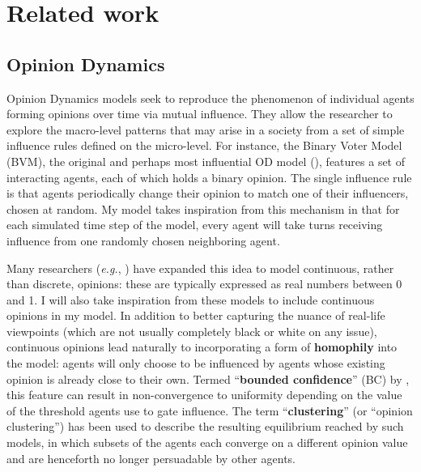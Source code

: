\section{Related work}

\subsection{Opinion Dynamics}

Opinion Dynamics models seek to reproduce the phenomenon of individual agents
forming opinions over time via mutual influence. They allow the researcher to
explore the macro-level patterns that may arise in a society from a set
of simple influence rules defined on the micro-level. For instance, the Binary
Voter Model (BVM), the original and perhaps most influential OD model
(\cite{clifford_model_1973, holley_ergodic_1975}), features a set of
interacting agents, each of which holds a binary opinion. The single influence
rule is that agents periodically change their opinion to match one of their
influencers, chosen at random. My model takes inspiration from this mechanism in that for each simulated time step of the model, every agent will take turns receiving influence from one randomly chosen neighboring agent. 

Many researchers (\textit{e.g.}, \cite{ghaderi_opinion_2012,
weisbuch_interacting_2001}) have expanded this idea to model continuous, rather
than discrete, opinions: these are typically expressed as real numbers between
0 and 1. I will also take inspiration from these models to include continuous opinions in my model. In addition to better capturing the nuance of real-life viewpoints
(which are not usually completely black or white on any issue), continuous
opinions lead naturally to incorporating a form of
\textbf{homophily}\cite{mcpherson_birds_2001} into the model: agents will only
choose to be influenced by agents whose existing opinion is already close to
their own. Termed ``\textbf{bounded confidence}'' (BC) by
\cite{hegselmann_opinion_2002}, this feature can result in non-convergence to
uniformity depending on the value of the threshold agents use to gate
influence.\cite{hegselmann_opinion_2002, deffuant_mixing_2000,
tsang_opinion_2014} The term ``\textbf{clustering}'' (or ``opinion
clustering'') has been used to describe the resulting equilibrium reached by
such models, in which subsets of the agents each converge on a different
opinion value and are henceforth no longer persuadable by other agents.

